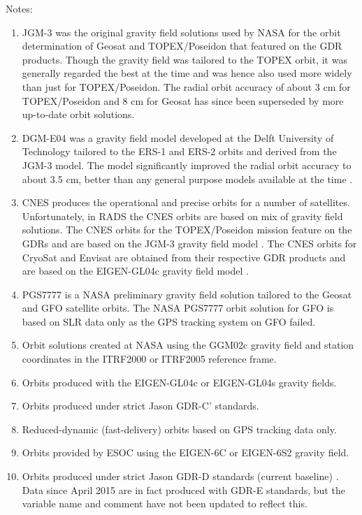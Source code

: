 \documentclass[a4paper,11pt,openany,natbib]{thesis}
\begin{document}
Notes:
\begin{enumerate}
\item JGM-3 \citep{tapley1996} was the original gravity field solutions used by NASA for the orbit determination of Geosat and TOPEX/Poseidon that featured on the GDR products. Though the gravity field was tailored to the TOPEX orbit, it was generally regarded the best at the time and was hence also used more widely than just for TOPEX/Poseidon. The radial orbit accuracy of about 3 cm for TOPEX/Poseidon and 8 cm for Geosat has since been superseded by more up-to-date orbit solutions.\label{item:alt_jgm3}
\item DGM-E04 was a gravity field model developed at the Delft University of Technology tailored to the ERS-1 and ERS-2 orbits and derived from the JGM-3 model. The model significantly improved the radial orbit accuracy to about 3.5 cm, better than any general purpose models available at the time \citep{scharroo1998a}.\label{item:alt_dgme04}
\item CNES produces the operational and precise orbits for a number of satellites. Unfortunately, in RADS the CNES orbits are based on mix of gravity field solutions. The CNES orbits for the TOPEX/Poseidon mission feature on the GDRs and are based on the JGM-3 gravity field model \citep{tapley1996}. The CNES orbits for CryoSat and Envisat are obtained from their respective GDR products and are based on the EIGEN-GL04c gravity field model \citep{ablain2008}.\label{item:alt_cnes}
\item PGS7777 is a NASA preliminary gravity field solution tailored to the Geosat and GFO satellite orbits. The NASA PGS7777 orbit solution for GFO \citep{lemoine2006a} is based on SLR data only as the GPS tracking system on GFO failed.\label{item:alt_pgs7777}
\item Orbit solutions created at NASA using the GGM02c gravity field and station coordinates in the ITRF2000 or ITRF2005 reference frame.\label{item:alt_ggm02c}
\item Orbits produced with the EIGEN-GL04c or EIGEN-GL04s gravity fields.\label{item:alt_eiggl04s}
\item Orbits produced under strict Jason GDR-C' standards.\label{item:alt_gdrcp}
\item Reduced-dynamic (fast-delivery) orbits based on GPS tracking data only.\label{item:alt_gps}
\item Orbits provided by ESOC using the EIGEN-6C or EIGEN-6S2 gravity field.\label{item:alt_eig6}
\item Orbits produced under strict Jason GDR-D standards (current baseline) \citep{ids2011}. Data since April 2015 are in fact produced with GDR-E standards, but the variable name and comment have not been updated to reflect this.\label{item:alt_gdrd}

\end{enumerate}
\end{document}

